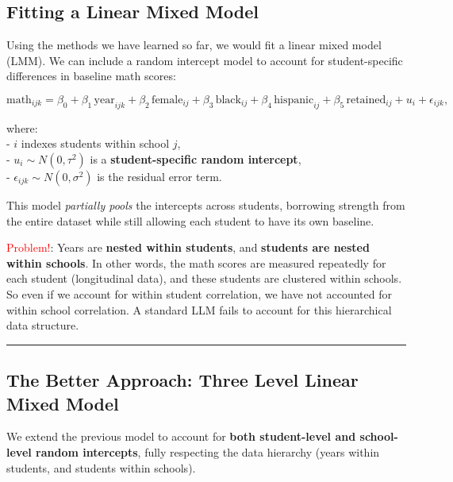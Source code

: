 \documentclass[
  letterpaper,
  DIV=11,
  numbers=noendperiod]{scrreprt}
\begin{document}
\hypertarget{fitting-a-linear-mixed-model}{%
\subsection*{Fitting a Linear Mixed
Model}\label{fitting-a-linear-mixed-model}}

Using the methods we have learned so far, we would fit a linear mixed
model (LMM). We can include a random intercept model to account for
student-specific differences in baseline math scores:

\[
\text{math}_{ijk} = \beta_0 + \beta_1 \, \text{year}_{ijk} + \beta_2 \, \text{female}_{ij} + \beta_3 \, \text{black}_{ij} + \beta_4 \, \text{hispanic}_{ij} + \beta_5 \, \text{retained}_{ij} + u_{i} + \epsilon_{ijk},
\]

where:\\
- \(i\) indexes students within school \(j\),\\
- \(u_{i} \sim N(0, \tau^2)\) is a \textbf{student-specific random
intercept},\\
- \(\epsilon_{ijk} \sim N(0, \sigma^2)\) is the residual error term.

This model \emph{partially pools} the intercepts across students,
borrowing strength from the entire dataset while still allowing each
student to have its own baseline.

\textcolor{red}{Problem!}: Years are \textbf{nested within students},
and \textbf{students are nested within schools}. In other words, the
math scores are measured repeatedly for each student (longitudinal
data), and these students are clustered within schools. So even if we
account for within student correlation, we have not accounted for within
school correlation. A standard LLM fails to account for this
hierarchical data structure.

\begin{center}\rule{0.5\linewidth}{0.5pt}\end{center}

\hypertarget{the-better-approach-three-level-linear-mixed-model}{%
\subsection*{The Better Approach: Three Level Linear Mixed
Model}\label{the-better-approach-three-level-linear-mixed-model}}

We extend the previous model to account for \textbf{both student-level
and school-level random intercepts}, fully respecting the data hierarchy
(years within students, and students within schools).
\end{document}

